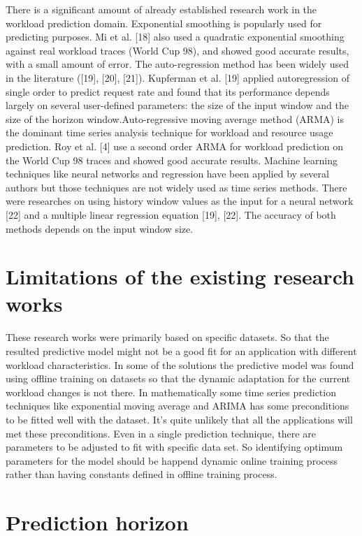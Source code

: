 There is a significant amount of already established research work in the workload prediction domain. Exponential smoothing is popularly used for predicting purposes. Mi et al. [18] also used a quadratic exponential smoothing against real workload traces (World Cup 98), and showed good accurate results, with a small amount of error. The auto-regression method has been widely used in the literature ([19], [20], [21]). Kupferman et al. [19] applied autoregression of single order to predict request rate and found that its performance depends largely on several user-defined parameters: the size of the input window and the size of the horizon window.Auto-regressive moving average method (ARMA) is the dominant time series analysis technique for workload and resource usage prediction. Roy et al. [4] use a second order ARMA for workload prediction on the World Cup 98 traces and showed good accurate results. Machine learning techniques like neural networks and regression have been applied by several authors but those techniques are not widely used as time series methods. There were researches on using history window values as the input for a neural network [22] and a multiple linear regression equation [19], [22]. The accuracy of both methods depends on the input window size.


\section{Limitations of the existing research works}

 These research works were primarily based on specific datasets. So that the resulted predictive model might not be a good fit for an application with different workload characteristics. In some of the solutions the predictive model was found using offline training on datasets so that the dynamic adaptation for the current workload changes is not there. 
In mathematically some time series prediction techniques like exponential moving average and ARIMA has some preconditions to be fitted well with the dataset. It’s quite unlikely that all the applications will met these preconditions. Even in a single prediction technique, there are parameters to be adjusted to fit with specific data set. So identifying optimum parameters for the model should be happend dynamic online training process rather than having constants defined in offline training process.


\section{Prediction horizon}

